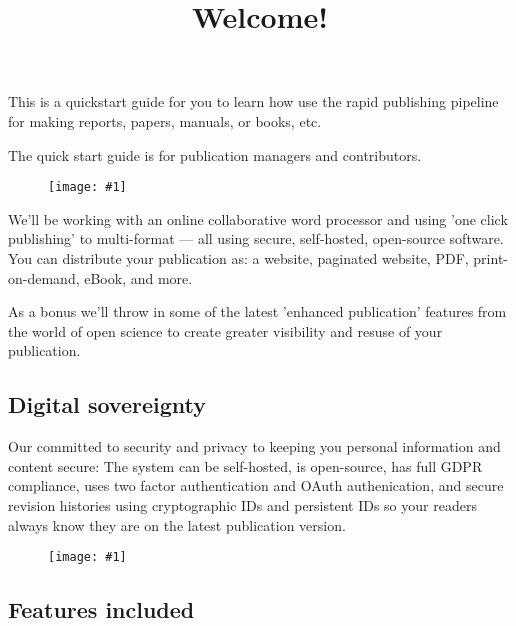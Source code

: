 \documentclass{article}
\newlength{\imgwidth}
\newcommand\scaledgraphics[2]{%
                
\settowidth{\imgwidth}{\texttt{[image: \#1]}}%
                
\setlength{\imgwidth}{\minof{\imgwidth}{#2\textwidth}}%
                
\texttt{[image: \#1]}%
                
}
\begin{document}
\title{Welcome!}

\maketitle


This is a quickstart guide for you to learn how use the rapid publishing pipeline for making reports, papers, manuals, or books, etc.


The quick start guide is for publication managers and contributors.

\begin{figure}
\scaledgraphics{b3bc6ba5-db38-4ec8-89db-45c029fdb485.png}{1}
\label{F98934631}
\end{figure}


We'll be working with an online collaborative word processor and using 'one click publishing' to multi-format — all using secure, self-hosted, open-source software. You can distribute your publication as: a website, paginated website, PDF, print-on-demand, eBook, and more.


As a bonus we'll throw in some of the latest 'enhanced publication' features from the world of open science to create greater visibility and resuse of your publication.


\subsection{Digital \textbf{sovereignty}}\label{H584803}



Our committed to security and privacy to keeping you personal information and content secure: The system can be self-hosted, is open-source, has full GDPR compliance, uses two factor authentication and OAuth authenication, and secure revision histories using cryptographic IDs and persistent IDs so your readers always know they are on the latest publication version. 

\begin{figure}
\scaledgraphics{60a0cd01-c4e1-467e-a517-a5ae77dbbbaf.png}{0.75}
\label{F45597451}
\end{figure}


\subsection{Features included}\label{H2087393}
\end{document}
